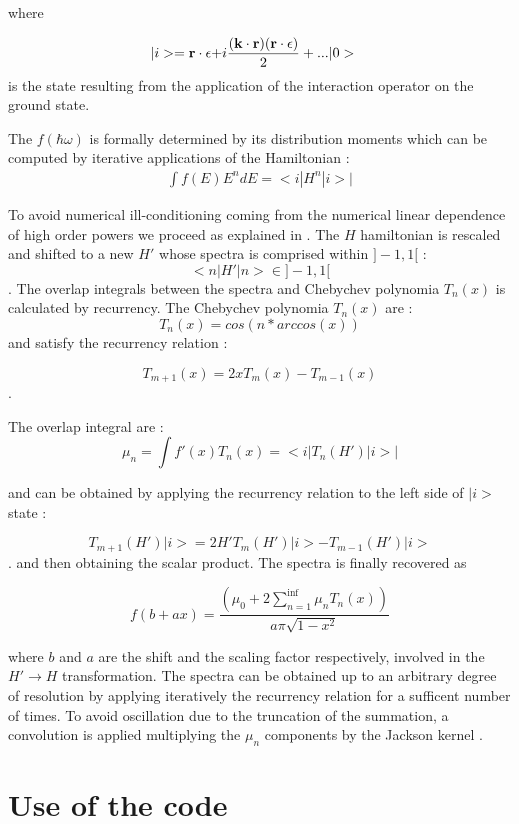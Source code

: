 \documentclass[a4paper,11pt]{report}
\begin{document}
where 

\begin{eqnarray}
  |i> =   { {\bf  r} \cdot  {\bf \epsilon} }  +& i\frac{( { \bf k \cdot r})(  {\bf  r \cdot  \epsilon })}{2} +... | 0 > 
\end{eqnarray}
is the state resulting from the application of the interaction operator on the ground state.

 The $f(\hbar \omega)$ is formally determined by its distribution moments
which can be computed by iterative applications of the Hamiltonian :
\begin{eqnarray}
  \int  f(E) E^n d E =     < i | H^n| i > |
\end{eqnarray}

To avoid numerical ill-conditioning coming from the numerical linear dependence of  high order powers we proceed as explained in \cite{weiss}.
 The $H$ hamiltonian is rescaled  and shifted to a  new $H'$     whose  spectra
is comprised within $]-1,1[$ :
$$   < n | H' | n > \in      ]-1,1[   $$.
The overlap integrals between the spectra and Chebychev polynomia $T_n(x)$ is calculated by  recurrency.
The Chebychev polynomia $T_n(x)$ are :
$$       T_n(x) = cos( n * arccos(x)) $$
and satisfy the recurrency relation :

$$ T_{m+1}(x) = 2 x T_m(x) - T_{m-1} (x)$$.

The overlap integral are :
$$   \mu_n =  \int  f'(x) T_n(x)  =     < i |  T_n(H') | i > |         $$

and can be obtained by applying  the recurrency relation to the left side of $|i>$ state :

$$ T_{m+1}(H')| i > = 2 H' T_m(H')| i > - T_{m-1} (H')| i >  $$.
and then obtaining  the scalar product. The spectra is finally recovered as 

$$  f( b+a x) = \frac{  (\mu_0+ 2 \sum_{n=1}^{\inf} \mu_n T_n(x)) }{a \pi \sqrt{1 - x^2} }            $$


where $b$ and $a$ are the shift and the scaling factor respectively, involved in the $ H' \rightarrow H $ transformation.
The spectra can be obtained up to an arbitrary degree of resolution by
applying iteratively the recurrency relation for a sufficent number of times. To avoid oscillation
due to the truncation of the summation, a convolution is applied multiplying the $\mu_n$ 
components by the Jackson kernel \cite{weiss}. 




\section{Use of the code}
\end{document}

